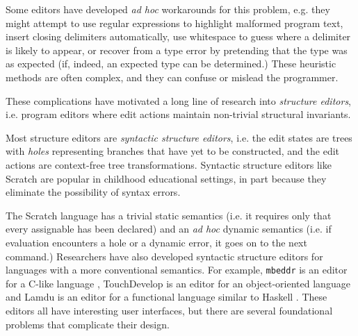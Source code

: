 Some editors have developed \emph{ad hoc} workarounds for this problem, e.g. they might attempt to use regular expressions to highlight malformed program text, insert closing delimiters automatically, use whitespace to guess where a delimiter is likely to appear, or recover from a type error by pretending that the type was as expected (if, indeed, an expected type can be determined.) These heuristic methods are often complex, and they can confuse or mislead the programmer. %


These complications have motivated a long line of research into \emph{structure editors}, i.e. program editors where edit actions maintain non-trivial structural invariants.  

Most structure editors are \emph{syntactic structure editors}, i.e. the edit states are trees with \emph{holes} representing branches that have yet to be constructed, and the edit actions are context-free tree transformations. Syntactic structure editors like Scratch \cite{Resnick:2009:SP:1592761.1592779} are popular in childhood educational settings, in part because they eliminate the possibility of syntax errors. 

The Scratch language has a trivial static semantics (i.e. it requires only that every assignable has been declared) and an \emph{ad hoc} dynamic semantics (i.e. if evaluation encounters a hole or a dynamic error, it goes on to the next command.) Researchers have also developed syntactic structure editors for  languages with a more conventional semantics. For example, \texttt{mbeddr} is an editor for a C-like language \cite{voelter_mbeddr:_2012}, TouchDevelop is an editor for an object-oriented language \cite{tillmann_touchdevelop:_2011} and Lamdu is an editor for a functional language similar to Haskell \cite{lamdu}. These editors all have interesting user interfaces, but there are several foundational problems that complicate their design. 


